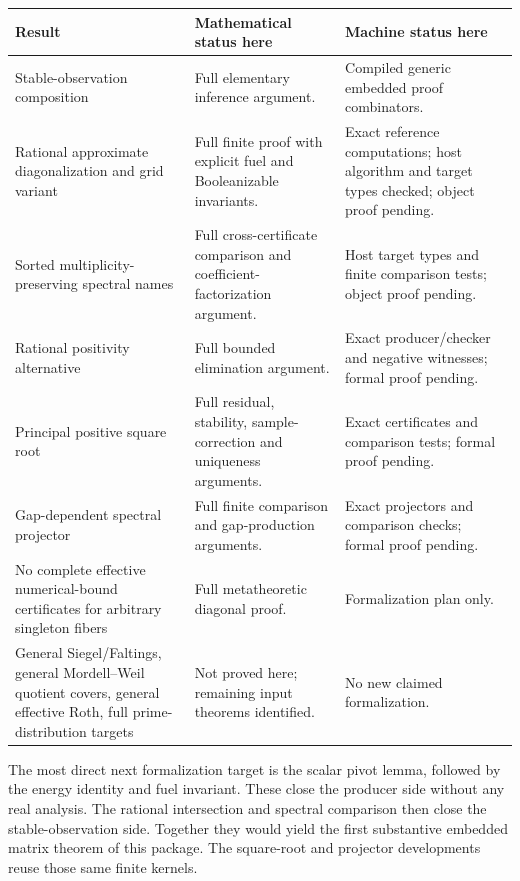 \begin{longtable}{@{}P{0.36\textwidth}P{0.27\textwidth}P{0.31\textwidth}@{}}
\toprule
Result & Mathematical status here & Machine status here \\
\midrule\endhead
Stable-observation composition & Full elementary inference argument. & Compiled generic embedded proof combinators. \\
Rational approximate diagonalization and grid variant & Full finite proof with explicit fuel and Booleanizable invariants. & Exact reference computations; host algorithm and target types checked; object proof pending. \\
Sorted multiplicity-preserving spectral names & Full cross-certificate comparison and coefficient-factorization argument. & Host target types and finite comparison tests; object proof pending. \\
Rational positivity alternative & Full bounded elimination argument. & Exact producer/checker and negative witnesses; formal proof pending. \\
Principal positive square root & Full residual, stability, sample-correction and uniqueness arguments. & Exact certificates and comparison tests; formal proof pending. \\
Gap-dependent spectral projector & Full finite comparison and gap-production arguments. & Exact projectors and comparison checks; formal proof pending. \\
No complete effective numerical-bound certificates for arbitrary singleton fibers & Full metatheoretic diagonal proof. & Formalization plan only. \\
General Siegel/Faltings, general Mordell--Weil quotient covers, general effective Roth, full prime-distribution targets & Not proved here; remaining input theorems identified. & No new claimed formalization. \\
\bottomrule
\end{longtable}

The most direct next formalization target is the scalar pivot lemma, followed by the energy identity and fuel invariant. These close the producer side without any real analysis. The rational intersection and spectral comparison then close the stable-observation side. Together they would yield the first substantive embedded matrix theorem of this package. The square-root and projector developments reuse those same finite kernels.
